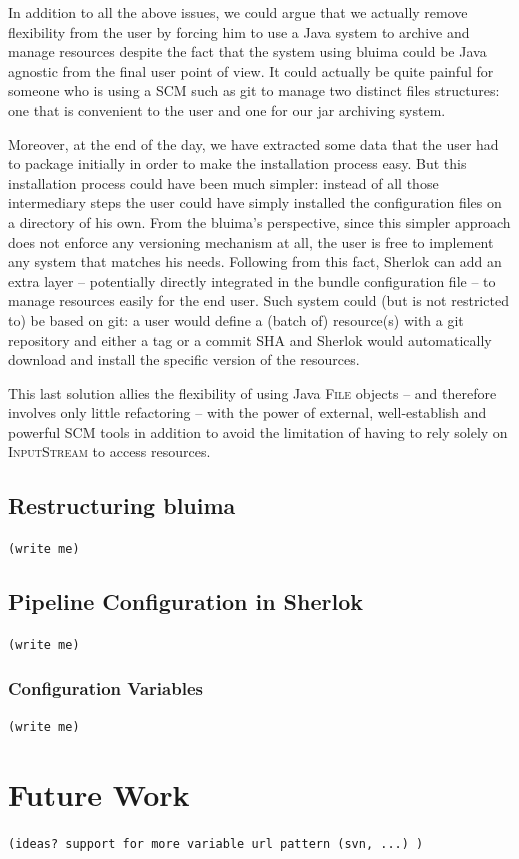 \documentclass{article}
\newcommand{\id}[1]{\mbox{\textsc{#1}}}
\newcommand{\TODO}[1]{\texttt{\textcolor{YellowOrange}{(#1)}}} %
\begin{document}
In addition to all the above issues, we could argue that we actually remove flexibility from the user by forcing him to use a Java system to archive and manage resources despite the fact that the system using bluima could be Java agnostic from the final user point of view. It could actually be quite painful for someone who is using a SCM such as git to manage two distinct files structures: one that is convenient to the user and one for our jar archiving system.

Moreover, at the end of the day, we have extracted some data that the user had to package initially in order to make the installation process easy. But this installation process could have been much simpler: instead of all those intermediary steps the user could have simply installed the configuration files on a directory of his own. From the bluima's perspective, since this simpler approach does not enforce any versioning mechanism at all, the user is free to implement any system that matches his needs. Following from this fact, Sherlok can add an extra layer -- potentially directly integrated in the bundle configuration file -- to manage resources easily for the end user. Such system could (but is not restricted to) be based on git: a user would define a (batch of) resource(s) with a git repository and either a tag or a commit SHA and Sherlok would automatically download and install the specific version of the resources.

This last solution allies the flexibility of using Java \id{File} objects -- and therefore involves only little refactoring -- with the power of external, well-establish and powerful SCM tools in addition to avoid the limitation of having to rely solely on \id{InputStream} to access resources.

\subsection{Restructuring bluima}

\TODO{write me}

\subsection{Pipeline Configuration in Sherlok}

\TODO{write me}

\subsubsection{Configuration Variables}

\TODO{write me}

\section{Future Work}

\TODO{ideas? support for more variable url pattern (svn, ...) }

\end{document}

